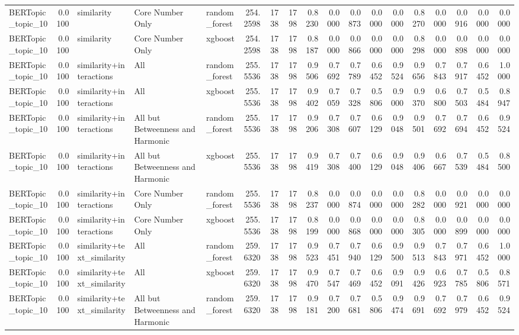 \begin{tabular}{lrlllrrrrrrrrrrrrr}
BERTopic_topic_10 & 0.0100 & similarity & Core Number Only & random_forest & 254.2598 & 1738 & 1798 & 0.8230 & 0.0000 & 0.0873 & 0.0000 & 0.0000 & 0.8270 & 0.0000 & 0.0916 & 0.0000 & 0.0000 \\
BERTopic_topic_10 & 0.0100 & similarity & Core Number Only & xgboost & 254.2598 & 1738 & 1798 & 0.8187 & 0.0000 & 0.0866 & 0.0000 & 0.0000 & 0.8298 & 0.0000 & 0.0898 & 0.0000 & 0.0000 \\
BERTopic_topic_10 & 0.0100 & similarity+interactions & All & random_forest & 255.5536 & 1738 & 1798 & 0.9506 & 0.7692 & 0.7789 & 0.6452 & 0.9524 & 0.9656 & 0.7843 & 0.7917 & 0.6452 & 1.0000 \\
BERTopic_topic_10 & 0.0100 & similarity+interactions & All & xgboost & 255.5536 & 1738 & 1798 & 0.9402 & 0.7059 & 0.7328 & 0.5806 & 0.9000 & 0.9370 & 0.6800 & 0.7503 & 0.5484 & 0.8947 \\
BERTopic_topic_10 & 0.0100 & similarity+interactions & All but Betweenness and Harmonic & random_forest & 255.5536 & 1738 & 1798 & 0.9206 & 0.7308 & 0.7607 & 0.6129 & 0.9048 & 0.9501 & 0.7692 & 0.7694 & 0.6452 & 0.9524 \\
BERTopic_topic_10 & 0.0100 & similarity+interactions & All but Betweenness and Harmonic & xgboost & 255.5536 & 1738 & 1798 & 0.9419 & 0.7308 & 0.7400 & 0.6129 & 0.9048 & 0.9406 & 0.6667 & 0.7539 & 0.5484 & 0.8500 \\
BERTopic_topic_10 & 0.0100 & similarity+interactions & Core Number Only & random_forest & 255.5536 & 1738 & 1798 & 0.8237 & 0.0000 & 0.0874 & 0.0000 & 0.0000 & 0.8282 & 0.0000 & 0.0921 & 0.0000 & 0.0000 \\
BERTopic_topic_10 & 0.0100 & similarity+interactions & Core Number Only & xgboost & 255.5536 & 1738 & 1798 & 0.8199 & 0.0000 & 0.0868 & 0.0000 & 0.0000 & 0.8305 & 0.0000 & 0.0899 & 0.0000 & 0.0000 \\
BERTopic_topic_10 & 0.0100 & similarity+text_similarity & All & random_forest & 259.6320 & 1738 & 1798 & 0.9523 & 0.7451 & 0.7940 & 0.6129 & 0.9500 & 0.9513 & 0.7843 & 0.7971 & 0.6452 & 1.0000 \\
BERTopic_topic_10 & 0.0100 & similarity+text_similarity & All & xgboost & 259.6320 & 1738 & 1798 & 0.9470 & 0.7547 & 0.7469 & 0.6452 & 0.9091 & 0.9426 & 0.6923 & 0.7785 & 0.5806 & 0.8571 \\
BERTopic_topic_10 & 0.0100 & similarity+text_similarity & All but Betweenness and Harmonic & random_forest & 259.6320 & 1738 & 1798 & 0.9181 & 0.7200 & 0.7681 & 0.5806 & 0.9474 & 0.9691 & 0.7692 & 0.7979 & 0.6452 & 0.9524 \\

\end{tabular}
